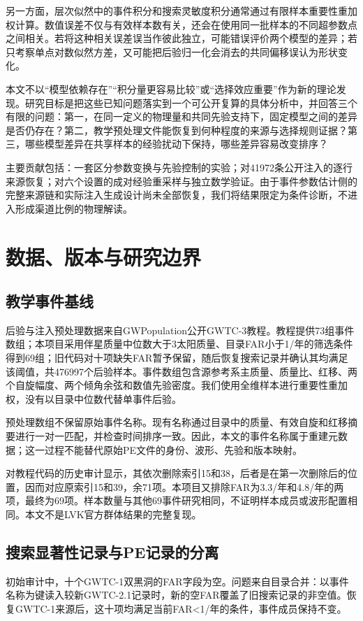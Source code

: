 \documentclass[UTF8,a4paper,11pt,fontset=fandol]{ctexart}
\begin{document}
另一方面，层次似然中的事件积分和搜索灵敏度积分通常通过有限样本重要性重加权计算。数值误差不仅与有效样本数有关，还会在使用同一批样本的不同超参数点之间相关\cite{ref3,ref4}。若将这种相关误差误当作彼此独立，可能错误评价两个模型的差异；若只考察单点对数似然方差，又可能把后验归一化会消去的共同偏移误认为形状变化。

本文不以“模型依赖存在”“积分量更容易比较”或“选择效应重要”作为新的理论发现。研究目标是把这些已知问题落实到一个可公开复算的具体分析中，并回答三个有限的问题：第一，在同一定义的物理量和共同先验支持下，固定模型之间的差异是否仍存在？第二，教学预处理文件能恢复到何种程度的来源与选择规则证据？第三，哪些模型差异在共享样本的经验扰动下保持，哪些差异容易改变排序？

主要贡献包括：一套区分参数变换与先验控制的实验；对41972条公开注入的逐行来源恢复；对六个设置的成对经验重采样与独立数学验证。由于事件参数估计侧的完整来源链和实际注入生成设计尚未全部恢复，我们将结果限定为条件诊断，不进入形成渠道比例的物理解读。

\FloatBarrier
\section{数据、版本与研究边界}\label{sec:2}
\subsection{教学事件基线}\label{sec:2.1}
后验与注入预处理数据来自GWPopulation公开GWTC-3教程\cite{ref7}。教程提供73组事件数组；本项目采用伴星质量中位数大于3太阳质量、目录FAR小于1/年的筛选条件得到69组；旧代码对十项缺失FAR暂予保留，随后恢复搜索记录并确认其均满足该阈值，共476997个后验样本。事件数组包含源参考系主质量、质量比、红移、两个自旋幅度、两个倾角余弦和数值先验密度。我们使用全维样本进行重要性重加权，没有以目录中位数代替单事件后验。

预处理数组不保留原始事件名称。现有名称通过目录中的质量、有效自旋和红移摘要进行一对一匹配，并检查时间排序一致。因此，本文的事件名称属于重建元数据；这一过程不能替代原始PE文件的身份、波形、先验和版本映射。

对教程代码的历史审计显示，其依次删除索引15和38，后者是在第一次删除后的位置，因而对应原索引15和39，余71项。本项目又排除FAR为3.3/年和4.8/年的两项，最终为69项。样本数量与其他69事件研究相同，不证明样本成员或波形配置相同。本文不是LVK官方群体结果的完整复现。

\subsection{搜索显著性记录与PE记录的分离}\label{sec:2.2}
初始审计中，十个GWTC-1双黑洞的FAR字段为空。问题来自目录合并：以事件名称为键读入较新GWTC-2.1记录时，新的空FAR覆盖了旧搜索记录的非空值。恢复GWTC-1来源后，这十项均满足当前FAR<1/年的条件，事件成员保持不变。
\end{document}
